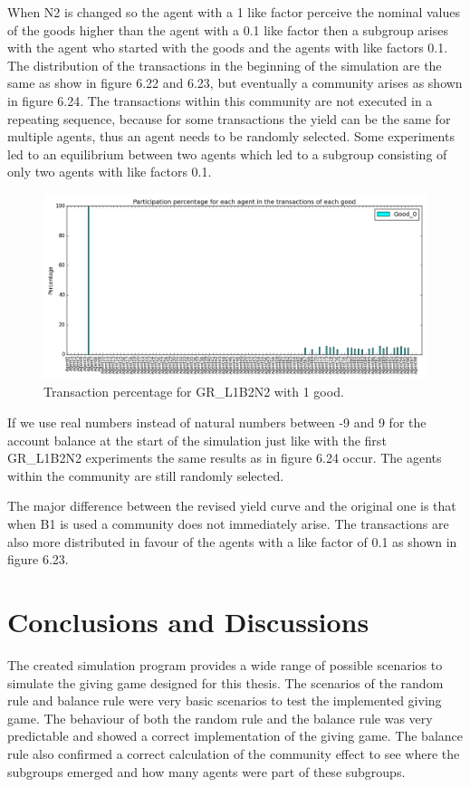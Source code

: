\documentclass[twoside,openright]{uva-bachelor-thesis}
\begin{document}
\begin{description}
When N2 is changed so the agent with a 1 like factor perceive the nominal values of the goods higher than the agent with a 0.1 like factor then a subgroup arises with the agent who started with the goods and the agents with like factors 0.1. The distribution of the transactions in the beginning of the simulation are the same as show in figure 6.22 and 6.23, but eventually a community arises as shown in figure 6.24. The transactions within this community are not executed in a repeating sequence, because for some transactions the yield can be the same for multiple agents, thus an agent needs to be randomly selected. Some experiments led to an equilibrium between two agents which led to a subgroup consisting of only two agents with like factors 0.1.
\begin{figure}[h!]
\centering
\includegraphics[scale=0.4]{Simulation2_figures/GR_L1B2N2_321_4k} 
\caption{Transaction percentage for GR\_L1B2N2 with 1 good.}
\end{figure}

If we use real numbers instead of natural numbers between -9 and 9 for the account balance at the start of the simulation just like with the first GR\_L1B2N2 experiments the same results as in figure 6.24 occur. The agents within the community are still randomly selected.

\end{description}

The major difference between the revised yield curve and the original one is that when B1 is used a community does not immediately arise. The transactions are also more distributed in favour of the agents with a like factor of 0.1 as shown in figure 6.23. 










\chapter{Conclusions and Discussions}
The created simulation program provides a wide range of possible scenarios to simulate the giving game designed for this thesis. The scenarios of the random rule and balance rule were very basic scenarios to test the implemented giving game. The behaviour of both the random rule and the balance rule was very predictable and showed a correct implementation of the giving game. The balance rule also confirmed a correct calculation of the community effect to see where the subgroups emerged and how many agents were part of these subgroups.
\end{document}
